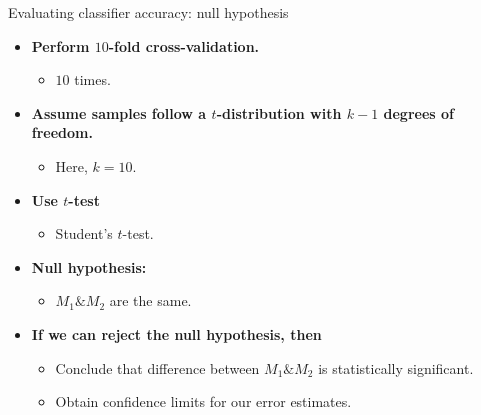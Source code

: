 \documentclass[aspectratio=169,t,table]{beamer}
\begin{document}
  {
    \begin{frame}{Evaluating classifier accuracy: null hypothesis}
      \begin{itemize}
        \item \textbf{Perform $10$-fold cross-validation.}
        \begin{itemize}
          \item $10$ times.
        \end{itemize}
        \item \textbf{Assume samples follow a $t$-distribution with $k-1$ degrees of freedom.}
        \begin{itemize}
          \item Here, $k = 10$.
        \end{itemize}
        \item \textbf{Use $t$-test}
        \begin{itemize}
          \item Student's $t$-test.
        \end{itemize}
        \item \textbf{Null hypothesis:}
        \begin{itemize}
          \item $M_1 \& M_2$ are the same.
        \end{itemize}
        \item \textbf{If we can reject the null hypothesis, then}
        \begin{itemize}
          \item Conclude that difference between $M_1 \& M_2$ is statistically significant.
          \item Obtain confidence limits for our error estimates.
        \end{itemize}
      \end{itemize}
    \end{frame}
  }
\end{document}
